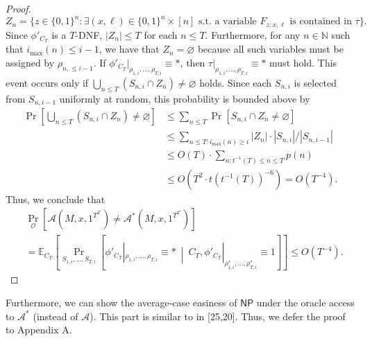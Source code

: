 \documentclass[10pt,a4paper]{article}
\begin{document}
\begin{proof}
\[Z_n=\{z\in\{0,1\}^n:\exists(x,\ell)\in\{0,1\}^n\times[n]\text{ s.t. a variable }F_{z,x,\ell}\text{ is contained in }\tau\}.\]
Since $\phi'_{C_T}$ is a $T$-DNF, $|Z_n|\leq T$ for each $n\leq T$. Furthermore, for any $n\in\mathbb N$ such that $i_{\max}(n)\leq i-1$, we have that $Z_n=\varnothing$ because all such variables must be assigned by $\rho_{n,\leq i-1}$. If $\phi'_{C_T}|_{\rho_{1,i},\ldots,\rho_{T,i}}\equiv*$, then $\tau|_{\rho_{1,i},\ldots,\rho_{T,i}}\equiv*$ must hold. This event occurs only if $\bigcup_{n\leq T}(S_{n,i}\cap Z_n)\neq\varnothing$ holds. Since each $S_{n,i}$ is selected from $S_{n,i-1}$ uniformly at random, this probability is bounded above by
\begin{align*}
\Pr\left[\bigcup_{n\leq T}(S_{n,i}\cap Z_n)\neq\varnothing\right]
&\leq\sum_{n\leq T}\Pr[S_{n,i}\cap Z_n\neq\varnothing]\\
&\leq\sum_{n\leq T:i_{\max}(n)\geq i}|Z_n|\cdot|S_{n,i}|/|S_{n,i-1}|\\
&\leq O(T)\cdot\sum_{n:t^{-1}(T)\leq n\leq T}p(n)\\
&\leq O(T^2\cdot t(t^{-1}(T))^{-6})=O(T^{-4}).
\end{align*}
Thus, we conclude that
\begin{align*}
&\Pr_{\mathcal O}[\mathcal A(M,x,1^{T^{2^c}})\neq\mathcal A^*(M,x,1^{T^{2^c}})]\\
&=\mathbb E_{C_T}\!\left[\Pr_{S_{1,i},\ldots,S_{T,i}}\!\left[\phi'_{C_T}|_{\rho_{1,i},\ldots,\rho_{T,i}}\equiv*\ \middle|\ C_T,\phi'_{C_T}|_{\rho^*_{1,i},\ldots,\rho^*_{T,i}}\equiv1\right]\right]\leq O(T^{-4}).
\end{align*}
\end{proof}
Furthermore, we can show the average-case easiness of $\mathsf{NP}$ under the oracle access to $\mathcal A^*$ (instead of $\mathcal A$). This part is similar to in [25,20]. Thus, we defer the proof to Appendix A.
\end{document}
